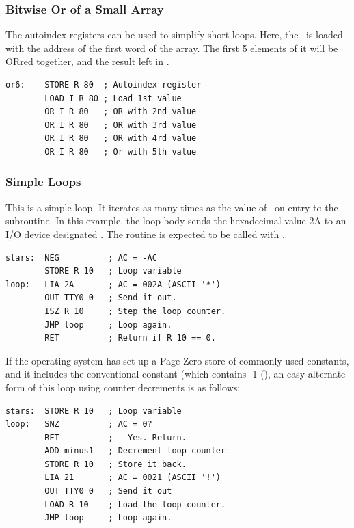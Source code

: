 \subsubsection{Bitwise Or of a Small Array}

The autoindex registers can be used to simplify short loops. Here, the
\A\ is loaded with the address of the first word of the array. The
first 5 elements of it will be ORred together, and the result left in
\A.

\begin{lstlisting}[language=cftasm]
or6:    STORE R 80  ; Autoindex register
        LOAD I R 80 ; Load 1st value
        OR I R 80   ; OR with 2nd value
        OR I R 80   ; OR with 3rd value
        OR I R 80   ; OR with 4rd value
        OR I R 80   ; Or with 5th value
\end{lstlisting}

\subsubsection{Simple Loops}

This is a simple loop. It iterates as many times as the value of
\A\ on entry to the subroutine. In this example, the loop body sends
the hexadecimal value {\ttfamily 2A} to an I/O device designated . The routine is expected to be called with .

\begin{lstlisting}[language=cftasm]
stars:  NEG          ; AC = -AC
        STORE R 10   ; Loop variable
loop:   LIA 2A       ; AC = 002A (ASCII '*')
        OUT TTY0 0   ; Send it out.
        ISZ R 10     ; Step the loop counter.
        JMP loop     ; Loop again.
        RET          ; Return if R 10 == 0.
\end{lstlisting}

If the operating system has set up a Page Zero store of commonly used
constants, and it includes the conventional constant  (which
contains -1 (), an easy alternate form of this loop using
counter decrements is as follows:

\begin{lstlisting}[language=cftasm]
stars:  STORE R 10   ; Loop variable
loop:   SNZ          ; AC = 0?
        RET          ;   Yes. Return.
        ADD minus1   ; Decrement loop counter
        STORE R 10   ; Store it back.
        LIA 21       ; AC = 0021 (ASCII '!')
        OUT TTY0 0   ; Send it out
        LOAD R 10    ; Load the loop counter.
        JMP loop     ; Loop again.
\end{lstlisting}

